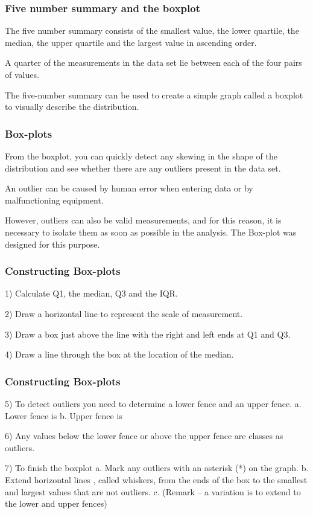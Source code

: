 \documentclass{beamer}
\begin{document}
\begin{frame}
\frametitle{Five number summary and the boxplot}
The five number summary consists of the smallest value, the lower quartile, the median, the upper quartile and the largest value in ascending order.

A quarter of the measurements in the data set lie between each of the four pairs of values. 

The five-number summary can be used to create a simple graph called a boxplot to visually describe the distribution.
\end{frame}

\begin{frame}
\frametitle{Box-plots}

From the boxplot, you can quickly detect any skewing in the shape of the distribution and see whether there are any outliers present in the data set.

An outlier can be caused by human error when entering data or by malfunctioning equipment. 

However, outliers can also be valid measurements, and for this reason, it is necessary to isolate them as soon as possible in the analysis. 
The Box-plot was designed for this purpose.
\end{frame}

\begin{frame}
\frametitle{Constructing Box-plots}

1) Calculate Q1, the median, Q3 and the IQR.

2) Draw a horizontal line to represent the scale of measurement.


3) Draw a box just above  the line with the right and left ends at Q1 and Q3.

4) Draw a line through the box at the location of the median.

\end{frame}

\begin{frame}
\frametitle{Constructing Box-plots}
5) To detect outliers you need to determine a lower fence and an upper fence.	
a. Lower fence is 
b. Upper fence is 

6) Any values below the lower fence or above the upper fence are classes as outliers.

7) To finish the boxplot
a. Mark any outliers with an asterisk (*) on the graph.
b. Extend horizontal lines , called whiskers, from the ends of the box to the smallest and largest values that are not outliers.
c. (Remark – a variation is to extend to the lower and upper fences)

	

\end{frame}
\end{document}
